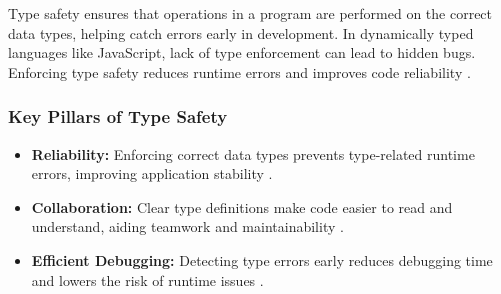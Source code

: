 Type safety ensures that operations in a program are performed on the correct data types, helping catch errors early in development. In dynamically typed languages like JavaScript, lack of type enforcement can lead to hidden bugs. Enforcing type safety reduces runtime errors and improves code reliability \cite{dev:type-safety}.

\subsubsection*{Key Pillars of Type Safety}
\label{subsubsec:type-safety-pillars}

\begin{itemize}
\item \textbf{Reliability:} Enforcing correct data types prevents type-related runtime errors, improving application stability \cite{dev:type-safety}.

\item \textbf{Collaboration:} Clear type definitions make code easier to read and understand, aiding teamwork and maintainability \cite{dev:type-safety}.

\item \textbf{Efficient Debugging:} Detecting type errors early reduces debugging time and lowers the risk of runtime issues \cite{dev:type-safety}.
\end{itemize}
